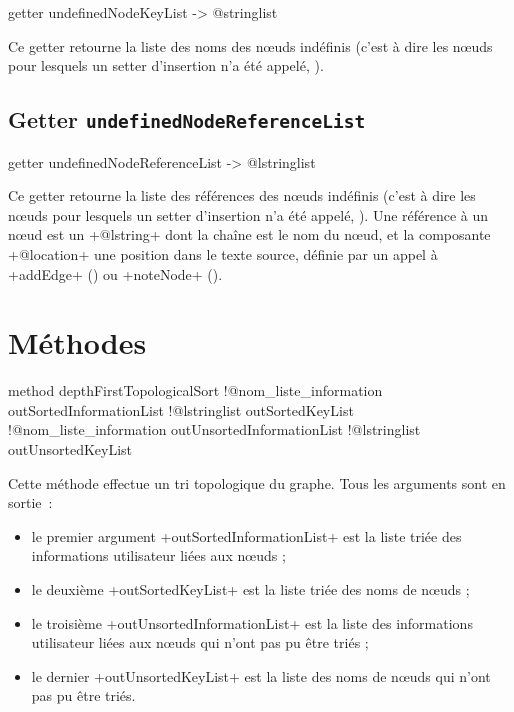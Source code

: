 \begin{galgas}
getter undefinedNodeKeyList -> @stringlist 
\end{galgas}

Ce getter retourne la liste des noms des nœuds indéfinis (c'est à dire les nœuds pour lesquels un setter d'insertion n'a été appelé, ).








\subsection{Getter \texttt{undefinedNodeReferenceList}}

\begin{galgas}
getter undefinedNodeReferenceList -> @lstringlist 
\end{galgas}

Ce getter retourne la liste des références des nœuds indéfinis (c'est à dire les nœuds pour lesquels un setter d'insertion n'a été appelé, ). Une référence à un nœud est un \ggs+@lstring+ dont la chaîne est le nom du nœud, et la composante \ggs+@location+ une position dans le texte source, définie par un appel à \ggs+addEdge+ () ou \ggs+noteNode+ ().




\section{Méthodes}


\begin{galgas}
method depthFirstTopologicalSort
  !@nom_liste_information outSortedInformationList
  !@lstringlist outSortedKeyList
  !@nom_liste_information outUnsortedInformationList
  !@lstringlist outUnsortedKeyList
\end{galgas}

Cette méthode effectue un tri topologique du graphe. Tous les arguments sont en sortie~:
\begin{itemize}
  \item le premier argument \ggs+outSortedInformationList+ est la liste triée des informations utilisateur liées aux nœuds ;
  \item le deuxième \ggs+outSortedKeyList+ est la liste triée des noms de nœuds ;
  \item le troisième \ggs+outUnsortedInformationList+ est la liste des informations utilisateur liées aux nœuds qui n'ont pas pu être triés ;
  \item le dernier \ggs+outUnsortedKeyList+ est la liste des noms de nœuds qui n'ont pas pu être triés.
\end{itemize}

